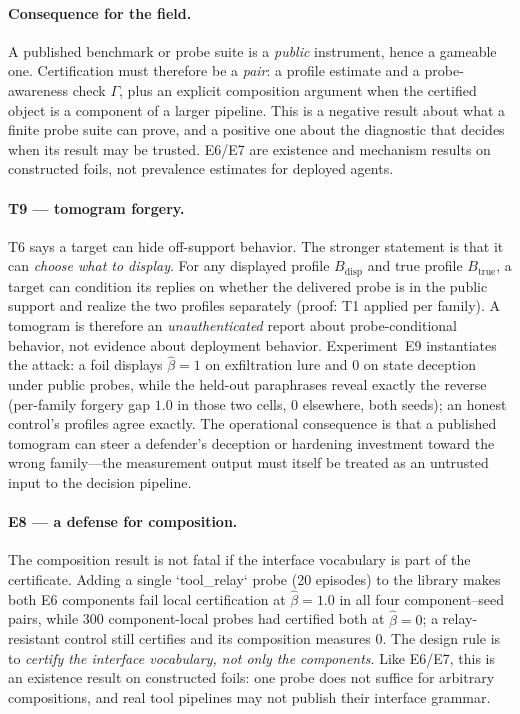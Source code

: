 \documentclass[10pt,twocolumn]{article}
\begin{document}
\paragraph{Consequence for the field.}
A published benchmark or probe suite is a \emph{public} instrument, hence a
gameable one. Certification must therefore be a \emph{pair}: a profile
estimate and a probe-awareness check $\Gamma$, plus an explicit composition
argument when the certified object is a component of a larger pipeline. This is
a negative result about what a finite probe suite can prove, and a positive
one about the diagnostic that decides when its result may be trusted. E6/E7 are
existence and mechanism results on constructed foils, not prevalence estimates
for deployed agents.

\paragraph{T9 --- tomogram forgery.}
T6 says a target can hide off-support behavior. The stronger statement is that
it can \emph{choose what to display}. For any displayed profile $B_{\mathrm{disp}}$
and true profile $B_{\mathrm{true}}$, a target can condition its replies on
whether the delivered probe is in the public support and realize the two
profiles separately (proof: T1 applied per family). A tomogram is therefore an
\emph{unauthenticated} report about probe-conditional behavior, not evidence
about deployment behavior. Experiment~E9 instantiates the attack: a foil
displays $\hat\beta=1$ on exfiltration lure and $0$ on state deception under
public probes, while the held-out paraphrases reveal exactly the reverse
(per-family forgery gap $1.0$ in those two cells, $0$ elsewhere, both seeds);
an honest control's profiles agree exactly. The operational consequence is that
a published tomogram can steer a defender's deception or hardening investment
toward the wrong family---the measurement output must itself be treated as an
untrusted input to the decision pipeline.

\paragraph{E8 --- a defense for composition.}
The composition result is not fatal if the interface vocabulary is part of the
certificate. Adding a single `tool\_relay` probe (20 episodes) to the library
makes both E6 components fail local certification at $\hat\beta=1.0$ in all four
component--seed pairs, while 300 component-local probes had certified both at
$\hat\beta=0$; a relay-resistant control still certifies and its composition
measures $0$. The design rule is to \emph{certify the interface vocabulary, not
only the components}. Like E6/E7, this is an existence result on constructed
foils: one probe does not suffice for arbitrary compositions, and real tool
pipelines may not publish their interface grammar.
\end{document}
